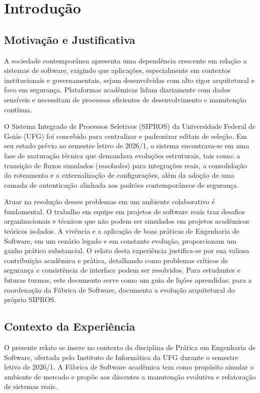 \chapter{Introdução}
\label{cap:introducao}

\section{Motivação e Justificativa}

A sociedade contemporânea apresenta uma dependência crescente em relação a sistemas de software, exigindo que aplicações, especialmente em contextos institucionais e governamentais, sejam desenvolvidas com alto rigor arquitetural e foco em segurança. Plataformas acadêmicas lidam diariamente com dados sensíveis e necessitam de processos eficientes de desenvolvimento e manutenção contínua. 

O Sistema Integrado de Processos Seletivos (SIPROS) da Universidade Federal de Goiás (UFG) foi concebido para centralizar e padronizar editais de seleção. Em seu estado prévio ao semestre letivo de 2026/1, o sistema encontrava-se em uma fase de maturação técnica que demandava evoluções estruturais, tais como: a transição de fluxos simulados (\textit{mockados}) para integrações reais, a consolidação do roteamento e a externalização de configurações, além da adoção de uma camada de autenticação alinhada aos padrões contemporâneos de segurança.

Atuar na resolução desses problemas em um ambiente colaborativo é fundamental. O trabalho em equipe em projetos de software reais traz desafios organizacionais e técnicos que não podem ser simulados em projetos acadêmicos teóricos isolados. A vivência e a aplicação de boas práticas de Engenharia de Software, em um cenário legado e em constante evolução, proporcionam um ganho prático substancial. O relato desta experiência justifica-se por sua valiosa contribuição acadêmica e prática, detalhando como problemas críticos de segurança e consistência de interface podem ser resolvidos. Para estudantes e futuras turmas, este documento serve como um guia de lições aprendidas; para a coordenação da Fábrica de Software, documenta a evolução arquitetural do próprio SIPROS.

\section{Contexto da Experiência}

O presente relato se insere no contexto da disciplina de Prática em Engenharia de Software, ofertada pelo Instituto de Informática da UFG durante o semestre letivo de 2026/1. A Fábrica de Software acadêmica tem como propósito simular o ambiente de mercado e propõe aos discentes a manutenção evolutiva e refatoração de sistemas reais.

